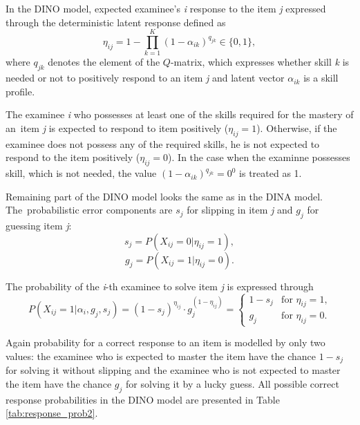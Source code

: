 \documentclass[english]{pwr_wmat_praca_dyplomowa}
\theoremstyle{plain}
\theoremstyle{definition}
\numberwithin{theorem}{chapter}
\begin{document}
In the DINO model, expected examinee's \textit{i} response to the item \textit{j} expressed through the deterministic latent response defined as
\begin{equation}
\eta_{ij} = 1- \prod\limits_{k=1}^{K} \left( 1 - \alpha_{ik} \right)^{q_{jk}} \in \{0,1\},
\end{equation}
where $q_{jk}$ denotes the element of the $Q$-matrix, which expresses whether skill \textit{k} is needed or not to positively respond to an item \textit{j} and latent vector $\alpha_{ik}$ is a skill profile.

The examinee \textit{i} who possesses at least one of the skills required for the mastery of an~item \textit{j} is expected to respond to item positively ($\eta_{ij} = 1$). Otherwise, if the examinee does not possess any of the required skills, he is not expected to respond to the item positively ($\eta_{ij} = 0$). In the case when the examinne possesses skill, which is not needed, the value $\left(1 - \alpha_{ik} \right)^{q_{jk}} = 0^0$ is treated as 1.

Remaining part of the DINO model looks the same as in the DINA model. The~probabilistic error components are $s_j$ for slipping in item \textit{j} and $g_j$ for guessing item \textit{j}:
\begin{equation}
s_j = P(X_{ij} = 0 | \eta_{ij} = 1),
\end{equation}
\begin{equation}
g_j = P(X_{ij} = 1 | \eta_{ij} = 0).
\end{equation}

\noindent The probability of the \textit{i}-th examinee to solve item \textit{j} is expressed through
\begin{equation}
P(X_{ij} = 1 | \alpha_i, g_j, s_j) = (1-s_j)^{\eta_{ij}} \cdot g_j^{(1-\eta_{ij})} = \left\{ \begin{array}{ll}
1 - s_j & \textrm{for $\eta_{ij} = 1$,} \\
g_j & \textrm{for $\eta_{ij} = 0$.} 
\end{array}\right.
\end{equation}

Again probability for a correct response to an item is modelled by only two values: the examinee who is expected to master the item have the chance $1 - s_j$ for solving it without slipping and the examinee who is not expected to master the item have the chance $g_j$ for solving it by a lucky guess. All possible correct response probabilities in the DINO model are presented in Table \ref{tab:response_prob2}.
\end{document}
